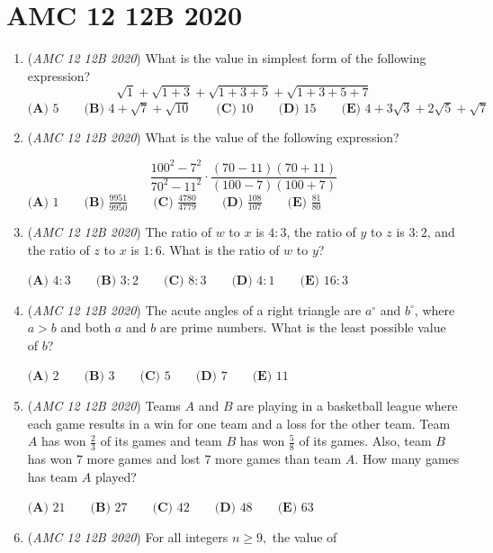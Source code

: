 \section{AMC 12 12B 2020}
        \begin{enumerate}
        	\item (\textit{AMC 12 12B 2020}) What is the value in simplest form of the following expression?
 \[\sqrt{1} + \sqrt{1+3} + \sqrt{1+3+5} + \sqrt{1+3+5+7}\]
$\textbf{(A) }5 \qquad \textbf{(B) }4 + \sqrt{7} + \sqrt{10} \qquad \textbf{(C) } 10 \qquad \textbf{(D) } 15 \qquad \textbf{(E) } 4 + 3\sqrt{3} + 2\sqrt{5} + \sqrt{7}$


	\item (\textit{AMC 12 12B 2020}) What is the value of the following expression?

 \[\frac{100^2-7^2}{70^2-11^2} \cdot \frac{(70-11)(70+11)}{(100-7)(100+7)}\]$\textbf{(A) } 1 \qquad \textbf{(B) } \frac{9951}{9950} \qquad \textbf{(C) } \frac{4780}{4779} \qquad \textbf{(D) } \frac{108}{107} \qquad \textbf{(E) } \frac{81}{80}$


	\item (\textit{AMC 12 12B 2020}) The ratio of $w$ to $x$ is $4 : 3$, the ratio of $y$ to $z$ is $3 : 2$, and the ratio of $z$ to $x$ is $1 : 6$. What is the ratio of $w$ to $y$?


 $\textbf{(A) }4:3 \qquad \textbf{(B) }3:2 \qquad \textbf{(C) } 8:3 \qquad \textbf{(D) } 4:1 \qquad \textbf{(E) } 16:3$


	\item (\textit{AMC 12 12B 2020}) The acute angles of a right triangle are $a^{\circ}$ and $b^{\circ}$, where $a>b$ and both $a$ and $b$ are prime numbers. What is the least possible value of $b$?


 $\textbf{(A) }2\qquad\textbf{(B) }3\qquad\textbf{(C) }5\qquad\textbf{(D) }7\qquad\textbf{(E) }11$


	\item (\textit{AMC 12 12B 2020}) Teams $A$ and $B$ are playing in a basketball league where each game results in a win for one team and a loss for the other team. Team $A$ has won $\frac{2}{3}$ of its games and team $B$ has won $\frac{5}{8}$ of its games. Also, team $B$ has won $7$ more games and lost $7$ more games than team $A.$ How many games has team $A$ played?


 $\textbf{(A) } 21 \qquad \textbf{(B) } 27 \qquad \textbf{(C) } 42 \qquad \textbf{(D) } 48 \qquad \textbf{(E) } 63$


	\item (\textit{AMC 12 12B 2020}) For all integers $n \geq 9,$ the value of


\end{enumerate}

